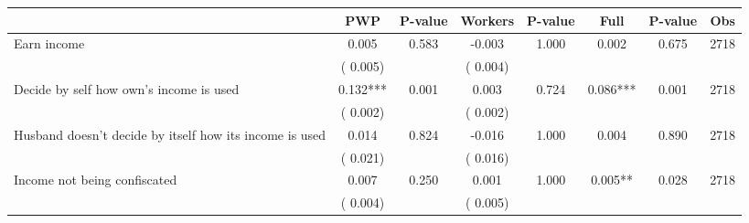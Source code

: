
\begin{tabular}{l*{7}{c}}\hline&\multicolumn{1}{c}{PWP}&\multicolumn{1}{c}{P-value}&\multicolumn{1}{c}{Workers}&\multicolumn{1}{c}{P-value}&\multicolumn{1}{c}{Full}&\multicolumn{1}{c}{P-value}&\multicolumn{1}{c}{Obs} \\ \hline

 Earn income       &              0.005       &        0.583  &             -0.003       &        1.000  &              0.002       &              0.675 &  2718 \\ 
                       &       (       0.005)             &                               &       (       0.004)                     &                               &                                               &                                &                      \\ 

 Decide by self how own's income is used       &              0.132***       &        0.001  &              0.003       &        0.724  &              0.086***       &              0.001 &  2718 \\ 
                       &       (       0.002)             &                               &       (       0.002)                     &                               &                                               &                                &                      \\ 

 Husband doesn't decide by itself how its income is used       &              0.014       &        0.824  &             -0.016       &        1.000  &              0.004       &              0.890 &  2718 \\ 
                       &       (       0.021)             &                               &       (       0.016)                     &                               &                                               &                                &                      \\ 

 Income not being confiscated       &              0.007       &        0.250  &              0.001       &        1.000  &              0.005**       &              0.028 &  2718 \\ 
                       &       (       0.004)             &                               &       (       0.005)                     &                               &                                               &                                &                      \\ 


\end{tabular}
